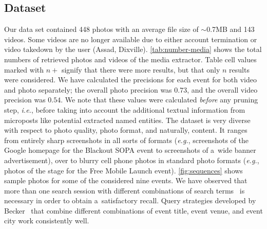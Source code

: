 \subsection{Dataset}
Our data set contained 448 photos with an average file size of
$\sim$0.7MB and 143 videos.
Some videos are no longer available due to either
account termination or video takedown by the user
(Assad, Dixville).
\autoref{tab:number-media} shows the total
numbers of retrieved photos and videos of the media extractor.
Table cell values marked with $n+$ signify that there were more 
results, but that only $n$ results were considered. 
We have calculated the precisions for each event for both video 
and photo separately; the overall photo precision was $0.73$,
and the overall video precision was $0.54$.
We note that these values were calculated \emph{before}
any pruning step, \emph{i.e.}, before taking into account
the additional textual information from microposts like
potential extracted named entities.
The dataset is very diverse with respect to photo quality,
photo format, and naturally, content.
It ranges from entirely sharp screenshots
in all sorts of formats (\emph{e.g.},
screenshots of the Google homepage for the Blackout SOPA event
to screenshots of a~wide banner advertisement),
over to blurry cell phone photos in standard photo formats
(\emph{e.g.}, photos of the stage
for the Free Mobile Launch event).
\autoref{fig:sequences} shows sample photos for
some of the considered nine events.
We have observed that more than one search session
with different combinations of search terms~%
\cite{becker2010eventidentification,becker2012plannedevents}
is necessary in order to obtain a~satisfactory recall.
Query strategies developed by Becker~\cite{becker2012plannedevents}
that combine different combinations of event title,
event venue, and event city work consistently well.

